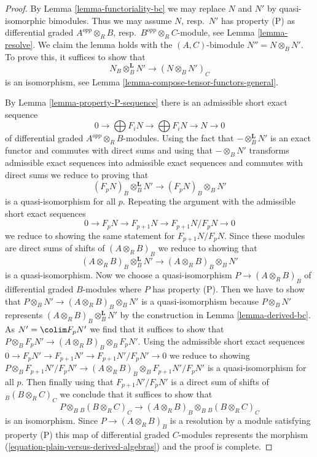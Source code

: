 \begin{proof}
By Lemma \ref{lemma-functoriality-bc} we may replace $N$ and $N'$ by
quasi-isomorphic bimodules. Thus we may assume $N$, resp.\ $N'$
has property (P) as differential graded
$A^{opp} \otimes_R B$, resp.\ $B^{opp} \otimes_R C$-module, see
Lemma \ref{lemma-resolve}. We claim the lemma holds
with the $(A, C)$-bimodule $N'' = N \otimes_B N'$.
To prove this, it suffices to show that
$$
N_B \otimes_B^\mathbf{L} N' \longrightarrow (N \otimes_B N')_C
$$
is an isomorphism, see Lemma \ref{lemma-compose-tensor-functors-general}.

\medskip\noindent
By Lemma \ref{lemma-property-P-sequence}
there is an admissible short exact sequence
$$
0 \to
\bigoplus\nolimits F_iN \to
\bigoplus\nolimits F_iN \to N \to 0
$$
of differential graded $A^{opp} \otimes_R B$-modules. Using the fact that
$- \otimes_B^\mathbf{L} N'$ is an exact functor and commutes
with direct sums and using that $- \otimes_B N'$ transforms
admissible exact sequences into admissible exact sequences
and commutes with direct sums we reduce to proving
that
$$
(F_pN)_B \otimes_B^\mathbf{L} N' \longrightarrow (F_pN)_B \otimes_B N'
$$
is a quasi-isomorphism for all $p$. Repeating the argument
with the admissible short exact sequences
$$
0 \to F_pN \to F_{p + 1}N \to F_{p + 1}N/F_pN \to 0
$$
we reduce to showing the same statement for $F_{p + 1}N/F_pN$.
Since these modules are direct sums of shifts of $(A \otimes_R B)_B$
we reduce to showing that
$$
(A \otimes_R B)_B \otimes_B^\mathbf{L} N'
\longrightarrow
(A \otimes_R B)_B \otimes_B N'
$$
is a quasi-isomorphism. Now we choose a quasi-isomorphism
$P \to (A \otimes_R B)_B$ of differential graded $B$-modules
where $P$ has property (P). Then we have to show that
$P \otimes_B N' \to (A \otimes_R B)_B \otimes_B N'$ is
a quasi-isomorphism because
$P \otimes_B N'$ represents
$(A \otimes_R B)_B \otimes_B^\mathbf{L} N'$
by the construction in Lemma \ref{lemma-derived-bc}.
As $N' = \colim F_pN'$ we find
that it suffices to show that
$P \otimes_B F_pN' \to (A \otimes_R B)_B \otimes_B F_pN'$.
Using the admissible short exact sequences
$0 \to F_pN' \to F_{p + 1}N' \to F_{p + 1}N'/F_pN' \to 0$
we reduce to showing
$P \otimes_B F_{p + 1}N'/F_pN' \to
(A \otimes_R B)_B \otimes_B F_{p + 1}N'/F_pN'$
is a quasi-isomorphism for all $p$.
Then finally using that $F_{p + 1}N'/F_pN'$
is a direct sum of shifts of ${}_B(B \otimes_R C)_C$
we conclude that it suffices to show that
$$
P \otimes_B {}_B(B \otimes_R C)_C \to
(A \otimes_R B)_B \otimes_B {}_B(B \otimes_R C)_C
$$
is an isomorphism. Since $P \to (A \otimes_R B)_B$
is a resolution by a module satisfying property (P)
this map of differential graded $C$-modules
represents the morphism (\ref{equation-plain-versus-derived-algebras})
and the proof is complete.
\end{proof}

